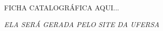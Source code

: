 \documentclass[12pt,openright,oneside,a4paper,ruledheader,pnumromarab,english]{abntex2}
\begin{document}
\frenchspacing 
\pretextual

\imprimircapa

\imprimirfolhaderosto*


\begin{fichacatalografica}
FICHA CATALOGRÁFICA AQUI... 

\textit{ELA SERÁ GERADA PELO SITE DA UFERSA}
	\vspace*{\fill}				%
\begin{center}					%

\vspace*{\fill}



\vspace{2ex}



\end{center}
\end{fichacatalografica}
\end{document}
